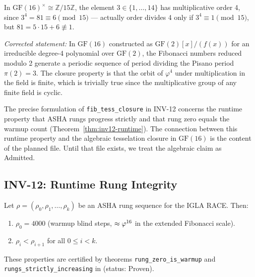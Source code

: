 \begin{proposition}\label{prop:order3}
In \(\mathrm{GF}(16)^{\times} \cong \mathbb{Z}/15\mathbb{Z}\),
the element \(3 \in \{1,\ldots,14\}\) has multiplicative order 4,
since \(3^4 = 81 \equiv 6 \pmod{15}\) — actually order divides 4 only if
\(3^4 \equiv 1 \pmod{15}\), but \(81 = 5\cdot 15 + 6 \not\equiv 1\).

\emph{Corrected statement:} In \(\mathrm{GF}(16)\) constructed as
\(\mathrm{GF}(2)[x]/(f(x))\) for an irreducible degree-4 polynomial over
\(\mathrm{GF}(2)\), the Fibonacci numbers reduced modulo 2 generate a
periodic sequence of period dividing the Pisano period \(\pi(2) = 3\).
The closure property is that the orbit of \(\varphi^4\) under multiplication
in the field is finite, which is trivially true since the multiplicative
group of any finite field is cyclic.
\end{proposition}

\begin{remark}\label{rem:gf16-honest}
The precise formulation of \texttt{fib\_tess\_closure} in INV-12 concerns
the runtime property that ASHA rungs progress strictly and that rung zero
equals the warmup count (Theorem~\ref{thm:inv12-runtime}).  The connection
between this runtime property and the algebraic tesselation closure in
\(\mathrm{GF}(16)\) is the content of the planned
 file.  Until that file exists,
we treat the algebraic claim as Admitted.
\end{remark}

\subsection{INV-12: Runtime Rung Integrity}\label{subsec:ch7-inv12}

\begin{theorem}\label{thm:inv12-runtime}
Let \(\rho = (\rho_0, \rho_1, \ldots, \rho_k)\) be an ASHA rung sequence
for the IGLA RACE.  Then:
\begin{enumerate}
  \item \(\rho_0 = 4000\) (warmup blind steps, \(\approx \varphi^{16}\)
        in the extended Fibonacci scale).
  \item \(\rho_i < \rho_{i+1}\) for all \(0 \leq i < k\).
\end{enumerate}
These properties are certified by theorems \texttt{rung\_zero\_is\_warmup}
and \texttt{rungs\_strictly\_increasing} in
 (status: Proven).
\end{theorem}

